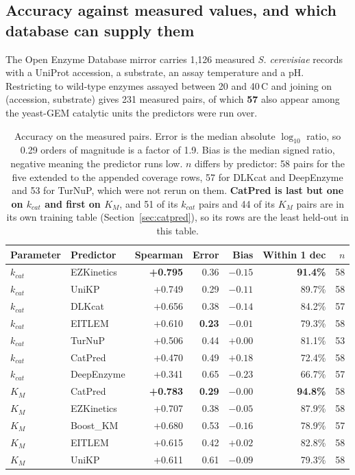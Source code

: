 \subsection{Accuracy against measured values, and which database can supply them}
\label{sec:accuracy}

The Open Enzyme Database mirror carries 1{,}126 measured \emph{S. cerevisiae} records with a
UniProt accession, a substrate, an assay temperature and a pH. Restricting to wild-type
enzymes assayed between 20 and 40\,\textdegree C and joining on (accession, substrate) gives
231 measured pairs, of which \textbf{57} also appear among the yeast-GEM catalytic units the
predictors were run over. 

\begin{table}[!htbp]
  \centering
  \footnotesize
  \caption[Predictor accuracy against measured yeast values]{Accuracy on the measured
  pairs. Error is the median absolute $\log_{10}$ ratio, so 0.29 orders of magnitude is a factor of 1.9.
  Bias is the median signed ratio, negative meaning the predictor runs low. $n$ differs by
  predictor: 58 pairs for the five extended to the appended coverage rows, 57 for DLKcat and
  DeepEnzyme and 53 for TurNuP, which were not rerun on them. \textbf{CatPred is last but one
  on $k_{cat}$ and first on $K_M$}, and 51 of its $k_{cat}$ pairs and 44 of its $K_M$ pairs
  are in its own training table (Section~\ref{sec:catpred}), so its rows are the least
  held-out in this table.}
  \label{tab:accuracy}
  \begin{tabular}{@{}llrrrrr@{}}
    \hline
    Parameter & Predictor & Spearman & Error & Bias & Within 1 dec & $n$ \\
    \hline
    $k_{cat}$ & EZKinetics & \textbf{+0.795} & 0.36 & $-0.15$ & \textbf{91.4\%} & 58 \\
    $k_{cat}$ & UniKP & +0.749 & 0.29 & $-0.11$ & 89.7\% & 58 \\
    $k_{cat}$ & DLKcat & +0.656 & 0.38 & $-0.14$ & 84.2\% & 57 \\
    $k_{cat}$ & EITLEM & +0.610 & \textbf{0.23} & $-0.01$ & 79.3\% & 58 \\
    $k_{cat}$ & TurNuP & +0.506 & 0.44 & $+0.00$ & 81.1\% & 53 \\
    $k_{cat}$ & CatPred & +0.470 & 0.49 & $+0.18$ & 72.4\% & 58 \\
    $k_{cat}$ & DeepEnzyme & +0.341 & 0.65 & $-0.23$ & 66.7\% & 57 \\
    \hline
    $K_M$ & CatPred & \textbf{+0.783} & \textbf{0.29} & $-0.00$ & \textbf{94.8\%} & 58 \\
    $K_M$ & EZKinetics & +0.707 & 0.38 & $-0.05$ & 87.9\% & 58 \\
    $K_M$ & Boost\_KM & +0.680 & 0.53 & $-0.16$ & 78.9\% & 57 \\
    $K_M$ & EITLEM & +0.615 & 0.42 & $+0.02$ & 82.8\% & 58 \\
    $K_M$ & UniKP & +0.611 & 0.61 & $-0.09$ & 79.3\% & 58 \\
    \hline
  \end{tabular}
\end{table}

